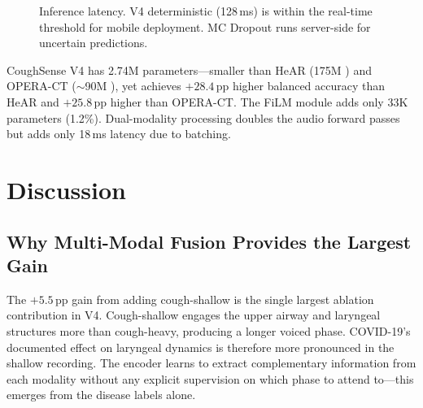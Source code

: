 \documentclass[journal]{IEEEtran}
\begin{document}
\begin{figure}[!t]
\centering
{}
\caption{Inference latency. V4 deterministic (128\,ms) is within the
real-time threshold for mobile deployment. MC Dropout runs server-side
for uncertain predictions.}
\label{fig:latency}
\end{figure}

CoughSense V4 has 2.74M parameters---smaller than HeAR (175M
\cite{hear2024}) and OPERA-CT ($\sim$90M \cite{opera2023}), yet
achieves $+28.4$\,pp higher balanced accuracy than HeAR and $+25.8$\,pp
higher than OPERA-CT. The FiLM module adds only 33K parameters (1.2\%).
Dual-modality processing doubles the audio forward passes but adds
only 18\,ms latency due to batching.

\section{Discussion}
\label{sec:discussion}

\subsection{Why Multi-Modal Fusion Provides the Largest Gain}

The $+5.5$\,pp gain from adding cough-shallow is the single largest
ablation contribution in V4. Cough-shallow engages the upper airway
and laryngeal structures more than cough-heavy, producing a longer
voiced phase. COVID-19's documented effect on laryngeal dynamics
\cite{spectral_fingerprints2024} is therefore more pronounced in the
shallow recording. The encoder learns to extract complementary
information from each modality without any explicit supervision on
which phase to attend to---this emerges from the disease labels alone.
\end{document}
